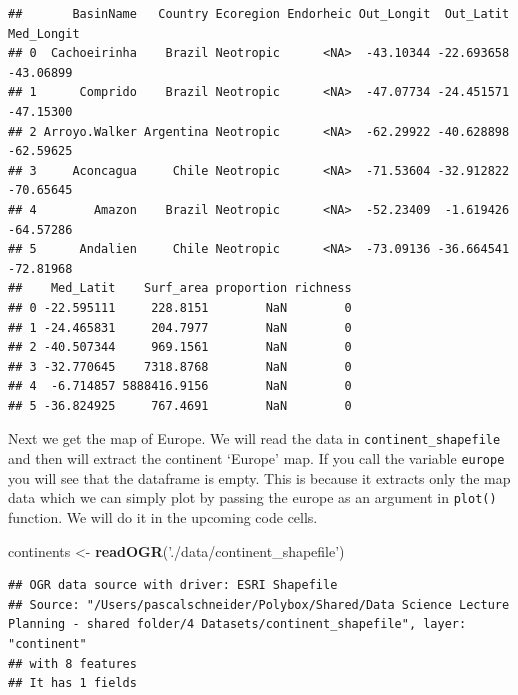 \documentclass[
]{book}
\newenvironment{Shaded}{\begin{snugshade}}{\end{snugshade}}
\newcommand{\KeywordTok}[1]{\textcolor[rgb]{0.13,0.29,0.53}{\textbf{#1}}}
\newcommand{\NormalTok}[1]{#1}
\newcommand{\OperatorTok}[1]{\textcolor[rgb]{0.81,0.36,0.00}{\textbf{#1}}}
\newcommand{\StringTok}[1]{\textcolor[rgb]{0.31,0.60,0.02}{#1}}
\begin{document}
\begin{verbatim}
##       BasinName   Country Ecoregion Endorheic Out_Longit  Out_Latit Med_Longit
## 0  Cachoeirinha    Brazil Neotropic      <NA>  -43.10344 -22.693658  -43.06899
## 1      Comprido    Brazil Neotropic      <NA>  -47.07734 -24.451571  -47.15300
## 2 Arroyo.Walker Argentina Neotropic      <NA>  -62.29922 -40.628898  -62.59625
## 3     Aconcagua     Chile Neotropic      <NA>  -71.53604 -32.912822  -70.65645
## 4        Amazon    Brazil Neotropic      <NA>  -52.23409  -1.619426  -64.57286
## 5      Andalien     Chile Neotropic      <NA>  -73.09136 -36.664541  -72.81968
##    Med_Latit    Surf_area proportion richness
## 0 -22.595111     228.8151        NaN        0
## 1 -24.465831     204.7977        NaN        0
## 2 -40.507344     969.1561        NaN        0
## 3 -32.770645    7318.8768        NaN        0
## 4  -6.714857 5888416.9156        NaN        0
## 5 -36.824925     767.4691        NaN        0
\end{verbatim}

Next we get the map of Europe. We will read the data in \texttt{continent\_shapefile} and then will extract the continent `Europe' map. If you call the variable \texttt{europe} you will see that the dataframe is empty. This is because it extracts only the map data which we can simply plot by passing the europe as an argument in \texttt{plot()} function. We will do it in the upcoming code cells.

\begin{Shaded}
\begin{Highlighting}[]
\NormalTok{continents <-}\StringTok{ }\KeywordTok{readOGR}\NormalTok{(}\StringTok{'./data/continent_shapefile'}\NormalTok{)}
\end{Highlighting}
\end{Shaded}

\begin{verbatim}
## OGR data source with driver: ESRI Shapefile 
## Source: "/Users/pascalschneider/Polybox/Shared/Data Science Lecture Planning - shared folder/4 Datasets/continent_shapefile", layer: "continent"
## with 8 features
## It has 1 fields
\end{verbatim}

\begin{Shaded}
\end{Shaded}
\end{document}

